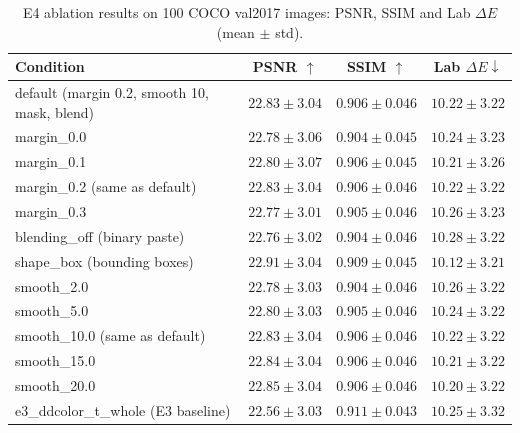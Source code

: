 \documentclass{FastFyp}
\begin{document}
\begin{table}[!htbp]
\centering
\caption{E4 ablation results on 100 COCO val2017 images: PSNR, SSIM and Lab $\Delta E$ (mean $\pm$ std).}
\label{tab:e4-summary}
\small
\setlength{\tabcolsep}{4pt}
\renewcommand{\arraystretch}{1.15}
\begin{tabularx}{\textwidth}{>{\raggedright\arraybackslash}Xccc}
\hline
Condition & PSNR $\uparrow$ & SSIM $\uparrow$ & Lab $\Delta E\downarrow$ \\
\hline
default (margin 0.2, smooth 10, mask, blend) & $22.83\pm3.04$ & $0.906\pm0.046$ & $10.22\pm3.22$ \\
margin\_0.0 & $22.78\pm3.06$ & $0.904\pm0.045$ & $10.24\pm3.23$ \\
margin\_0.1 & $22.80\pm3.07$ & $0.906\pm0.045$ & $10.21\pm3.26$ \\
margin\_0.2 (same as default) & $22.83\pm3.04$ & $0.906\pm0.046$ & $10.22\pm3.22$ \\
margin\_0.3 & $22.77\pm3.01$ & $0.905\pm0.046$ & $10.26\pm3.23$ \\
blending\_off (binary paste) & $22.76\pm3.02$ & $0.904\pm0.046$ & $10.28\pm3.22$ \\
shape\_box (bounding boxes) & $22.91\pm3.04$ & $0.909\pm0.045$ & $10.12\pm3.21$ \\
smooth\_2.0 & $22.78\pm3.03$ & $0.904\pm0.046$ & $10.26\pm3.22$ \\
smooth\_5.0 & $22.80\pm3.03$ & $0.905\pm0.046$ & $10.24\pm3.22$ \\
smooth\_10.0 (same as default) & $22.83\pm3.04$ & $0.906\pm0.046$ & $10.22\pm3.22$ \\
smooth\_15.0 & $22.84\pm3.04$ & $0.906\pm0.046$ & $10.21\pm3.22$ \\
smooth\_20.0 & $22.85\pm3.04$ & $0.906\pm0.046$ & $10.20\pm3.22$ \\
e3\_ddcolor\_t\_whole (E3 baseline) & $22.56\pm3.03$ & $0.911\pm0.043$ & $10.25\pm3.32$ \\
\hline
\end{tabularx}
\end{table}
\end{document}
